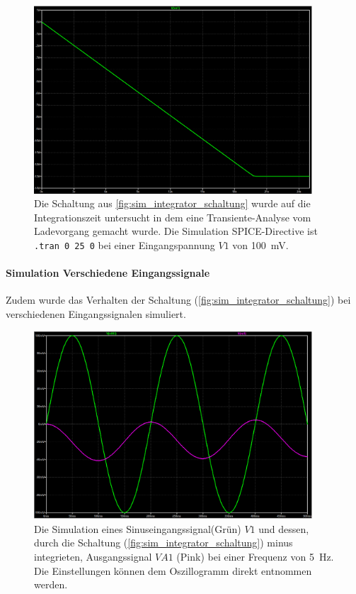 \documentclass[12pt,english,ngerman]{scrartcl}
\begin{document}
\begin{figure}[H]
  \centering
    \includegraphics[width=\linewidth, height=7cm]{./figures/integrator/sim/umkehr_int/dauer_aussteu.png}
  \caption{Die Schaltung aus \autoref{fig:sim_integrator_schaltung} wurde auf
  die Integrationszeit untersucht in dem eine Transiente-Analyse vom
  Ladevorgang gemacht wurde. Die Simulation SPICE-Directive ist \texttt{.tran 0 25 0} 
  bei einer Eingangspannung $V1$ von \SI{100}{\milli\volt}.}
  \label{fig:sim_integrator_integrationszeit}
\end{figure}

\paragraph{Simulation Verschiedene Eingangssignale}
Zudem wurde das Verhalten der Schaltung
(\autoref{fig:sim_integrator_schaltung}) bei verschiedenen Eingangssignalen
simuliert.

\begin{figure}[H]
  \centering
    \includegraphics[width=\linewidth, height=7cm]{./figures/integrator/sim/umkehr_int/sin_100mv_5hz.png}
    \caption{Die Simulation eines Sinuseingangssignal(Grün) $V1$ und dessen, durch
    die Schaltung (\autoref{fig:sim_integrator_schaltung}) minus integrieten,
  Ausgangssignal $VA1$ (Pink) bei einer Frequenz von \SI{5}{\hertz}. Die
Einstellungen können dem Oszillogramm direkt entnommen werden.}
  \label{fig:sim_int_ohne_sin}
\end{figure}
\end{document}
